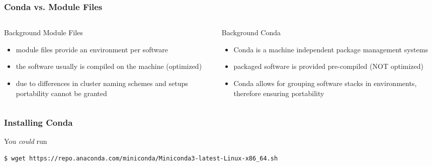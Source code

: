 \begin{frame}
  \frametitle{Conda vs. Module Files}
  \begin{columns}
    \begin{column}{0.5\textwidth}
      Background Module Files
      \begin{itemize}
       \item module files provide an environment per software
       \item the software usually is compiled on the machine (optimized)
       \item due to differences in cluster naming schemes and setups portability cannot be granted
      \end{itemize}
    \end{column}
    \begin{column}{0.5\textwidth}
      Background Conda
      \begin{itemize}
       \item Conda is a machine independent package management systems
       \item packaged software is provided pre-compiled (NOT optimized)
       \item Conda allows for grouping software stacks in environments, therefore ensuring portability
      \end{itemize}
    \end{column}
  \end{columns}
\end{frame}


\begin{frame}[fragile]
  \frametitle{Installing Conda}
  You \emph{could} run
  \begin{lstlisting}[language=Bash, style=Shell, basicstyle=\small,breaklines=true ]
$ wget https://repo.anaconda.com/miniconda/Miniconda3-latest-Linux-x86_64.sh
  \end{lstlisting}
  \pause
\end{frame} 

